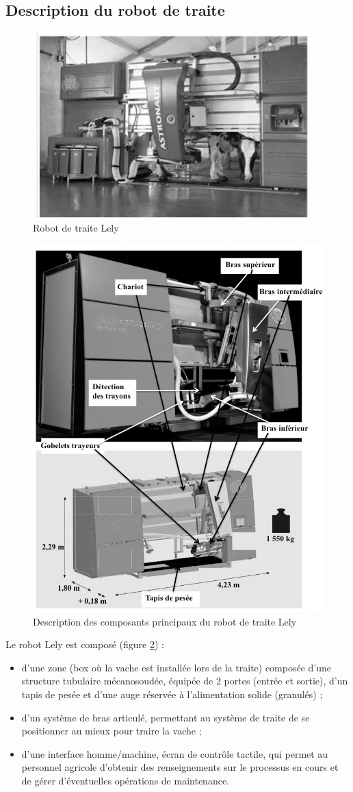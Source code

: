 \subsection{Description du robot de traite}

\begin{figure}[ht!]
\begin{center}
 \includegraphics[width=0.4\linewidth]{img/fig002}
\end{center}
\label{fig002}
\caption{Robot de traite Lely}
\end{figure}

\begin{figure}[ht!]
\begin{center}
 \includegraphics[width=0.5\linewidth]{img/fig003}
\end{center}
\label{fig003}
\caption{Description des composants principaux du robot de traite Lely}
\end{figure}

Le robot Lely est composé (figure \ref{fig003}) :
\begin{itemize}
 \item d’une zone (box où la vache est installée lors de la traite) composée d’une structure tubulaire mécanosoudée, équipée de 2 portes (entrée et sortie), d’un tapis de pesée et d’une auge réservée à l’alimentation solide (granulés) ;
 \item d’un système de bras articulé, permettant au système de traite de se positionner au mieux pour traire la vache ;
 \item d’une interface homme/machine, écran de contrôle tactile, qui permet au personnel agricole d’obtenir des renseignements sur le processus en cours et de gérer d’éventuelles opérations de maintenance.
\end{itemize}


